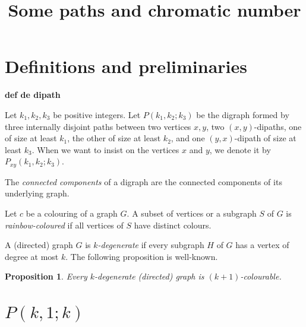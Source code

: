 \documentclass[utf8,10pt]{article}
\title{Some paths and chromatic number}
\theoremstyle{plain}
\newtheorem{proposition}[theorem]{Proposition}
\theoremstyle{definition}
\theoremstyle{remark}
\begin{document}
\maketitle

\section{Definitions and preliminaries}

{\bf def de dipath}

Let $k_1,k_2,k_3$ be positive integers. Let $P(k_1,k_2;k_3)$ be the digraph formed by three internally disjoint paths between two vertices $x,y$, two $(x,y)$-dipaths, one of size at least $k_1$, the other of size at least $k_2$, and one $(y,x)$-dipath of size at least $k_3$.
When we want to insist on the vertices $x$ and $y$, we denote it by $P_{xy}(k_1,k_2;k_3)$.


The {\it connected components} of a digraph are the connected components of its underlying graph.

Let $c$ be a colouring of a graph $G$. A subset of vertices or a subgraph $S$ of $G$ is {\it rainbow-coloured} if all vertices of $S$ have distinct colours.


A (directed) graph $G$ is {\it $k$-degenerate} if every subgraph $H$ of $G$ has a vertex of degree at most $k$.
The following proposition is well-known.
\begin{proposition}\label{prop:deg}
Every $k$-degenerate (directed) graph is $(k+1)$-colourable.
\end{proposition}



\section{$P(k,1;k)$}
\end{document}
